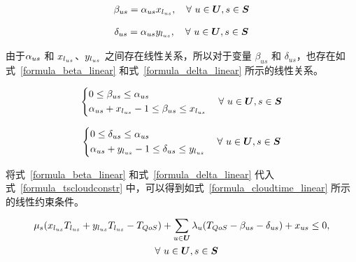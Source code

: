 \vspace{-1em}
\begin{equation}
\label{formula_beta}
  \begin{gathered}
    \beta_{us} = {\alpha}_{us} x_{l_{us}},
    \quad \forall\ u \in \boldsymbol{U}, s \in \boldsymbol{S}
  \end{gathered}
\end{equation}

\vspace{-1em}
\begin{equation}
  \label{formula_delta}
  \begin{gathered}
    \delta_{us} = {\alpha}_{us} y_{l_{us}},
    \quad \forall\ u \in \boldsymbol{U}, s \in \boldsymbol{S}
  \end{gathered}
\end{equation}

由于${\alpha}_{us}$ 和 $x_{l_{us}}$、$y_{l_{us}}$ 之间存在线性关系，所以对于变量 $\beta_{us}$ 和 $\delta_{us}$，也存在如式~\eqref{formula_beta_linear} 和式~\eqref{formula_delta_linear} 所示的线性关系。

\begin{equation}
  \label{formula_beta_linear}
  \left\{
  \begin{aligned}
    &0 \leq \beta_{us} \leq {\alpha}_{us} \\
    &{\alpha}_{us} + x_{l_{us}} -1 \leq \beta_{us} \leq x_{l_{us}}
  \end{aligned}
  \right.
  \quad \forall\ u \in \boldsymbol{U}, s \in \boldsymbol{S}
\end{equation}

\begin{equation}
  \label{formula_delta_linear}
  \left\{
  \begin{aligned}
    &0 \leq \delta_{us} \leq {\alpha}_{us} \\
    &{\alpha}_{us} + y_{l_{us}} -1 \leq \delta_{us} \leq y_{l_{us}}
  \end{aligned}
  \right.
  \quad \forall\ u \in \boldsymbol{U}, s \in \boldsymbol{S}
\end{equation}

将式~\eqref{formula_beta_linear} 和式~\eqref{formula_delta_linear} 代入式~\eqref{formula_tscloudconstr} 中，可以得到如式~\eqref{formula_cloudtime_linear} 所示的线性约束条件。

\begin{equation}
  \label{formula_cloudtime_linear}
  \begin{gathered}
    \mu_s (x_{l_{us}} T_{l_{us}} + y_{l_{us}} T_{l_{us}} - T_{QoS}) + \sum_{u \in \boldsymbol{U}}{\lambda}_{u}(T_{QoS} - \beta_{us} - \delta_{us}) + {x}_{us} \leq 0,\\
    \quad \forall\ u \in \boldsymbol{U}, s \in \boldsymbol{S}
  \end{gathered}
\end{equation}

